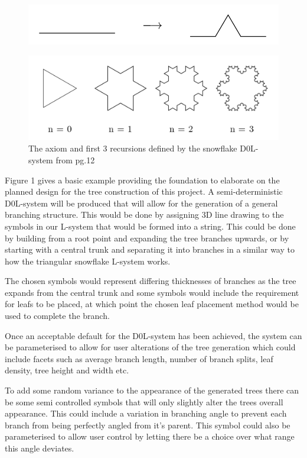 \documentclass[progress]{cmpreport}
\begin{document}
\begin{figure}[h]
        \includegraphics[scale=0.4]{production_p1}
        \centering
\end{figure}

\begin{figure}[h]
        \includegraphics[scale=0.5]{triangle_snowflake_lsystem}
        \centering
        \caption{The axiom and first 3 recursions defined by the snowflake D0L-system from 
                 \cite{prusinkiewicz1996systems} pg.12}
\end{figure}

Figure 1 gives a basic example providing the foundation to elaborate on the planned design for the tree 
construction of this project. A semi-deterministic D0L-system will be produced that will 
allow for the generation of a general branching structure. This would be done by assigning 
3D line drawing to the symbols in our L-system that would be formed into a string. This could 
be done by building from a root point and expanding the tree branches upwards, or by starting 
with a central trunk and separating it into branches in a similar way to how the triangular 
snowflake L-system works.

The chosen symbols would represent differing thicknesses of branches as the tree expands from 
the central trunk and some symbols would include the requirement for leafs to be placed, at 
which point the chosen leaf placement method would be used to complete the branch. 

Once an acceptable default for the D0L-system has been achieved, the system can be parameterised 
to allow for user alterations of the tree generation which could include facets such as average 
branch length, number of branch splits, leaf density, tree height and width etc.

To add some random variance to the appearance of the generated trees there can be some semi 
controlled symbols that will only slightly alter the trees overall appearance. This could 
include a variation in branching angle to prevent each branch from being perfectly angled 
from it's parent. This symbol could also be parameterised to allow user control by letting 
there be a choice over what range this angle deviates.
\end{document}
